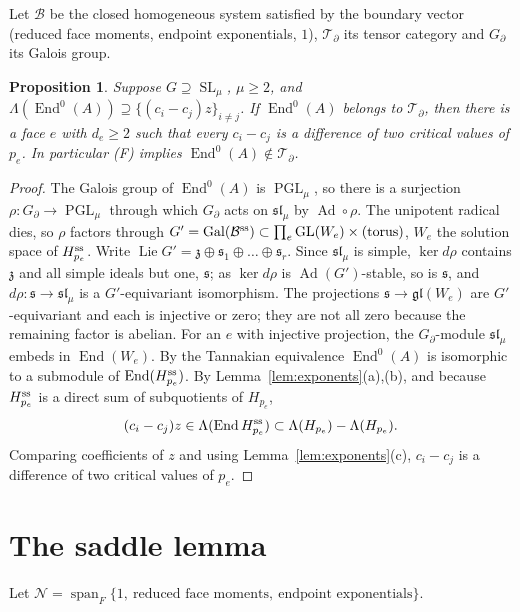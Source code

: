 \documentclass[11pt]{article}
\numberwithin{equation}{section}
\newtheorem{proposition}[theorem]{Proposition}
\theoremstyle{definition}
\theoremstyle{remark}
\newcommand{\SL}{\operatorname{SL}}\newcommand{\GL}{\operatorname{GL}}\newcommand{\PGL}{\operatorname{PGL}}
\newcommand{\End}{\operatorname{End}}\newcommand{\Hom}{\operatorname{Hom}}\newcommand{\Span}{\operatorname{span}}
\newcommand{\Lie}{\operatorname{Lie}}\newcommand{\Gal}{\operatorname{Gal}}\newcommand{\wt}{\operatorname{wt}}
\newcommand{\Ncal}{\mathcal N}\newcommand{\Tcal}{\mathcal T}\newcommand{\Bcal}{\mathcal B}
\begin{document}
Let $\Bcal$ be the closed homogeneous system satisfied by the boundary vector
(reduced face moments, endpoint exponentials, $1$), $\Tcal_\partial$ its tensor
category and $G_\partial$ its Galois group.

\begin{proposition}\label{prop:faces}
Suppose $G\supseteq\SL_\mu$, $\mu\ge2$, and
$\Lambda(\End^0(A))\supseteq\{(c_i-c_j)z\}_{i\ne j}$. If $\End^0(A)$
belongs to $\Tcal_\partial$, then there is a face $e$ with $d_e\ge2$ such that
every $c_i-c_j$ is a difference of two critical values of $p_e$. In particular
\textup{(F)} implies $\End^0(A)\notin\Tcal_\partial$.
\end{proposition}
\begin{proof}
The Galois group of $\End^0(A)$ is $\PGL_\mu$, so there is a surjection
$\rho:G_\partial\to\PGL_\mu$ through which $G_\partial$ acts on
$\mathfrak{sl}_\mu$ by $\operatorname{Ad}\circ\rho$. The unipotent radical dies,
so $\rho$ factors through $G'=\Gal(\Bcal^{\rm ss})\subset\prod_e\GL(W_e)\times(\text{torus})$,
$W_e$ the solution space of $H_{p_e}^{\rm ss}$. Write
$\Lie G'=\mathfrak z\oplus\mathfrak s_1\oplus\dots\oplus\mathfrak s_r$. Since
$\mathfrak{sl}_\mu$ is simple, $\ker d\rho$ contains $\mathfrak z$ and all simple
ideals but one, $\mathfrak s$; as $\ker d\rho$ is $\operatorname{Ad}(G')$-stable,
so is $\mathfrak s$, and $d\rho:\mathfrak s\to\mathfrak{sl}_\mu$ is a
$G'$-equivariant isomorphism. The projections
$\mathfrak s\to\mathfrak{gl}(W_e)$ are $G'$-equivariant and each is injective or
zero; they are not all zero because the remaining factor is abelian. For an
$e$ with injective projection, the $G_\partial$-module $\mathfrak{sl}_\mu$ embeds
in $\End(W_e)$. By the Tannakian equivalence $\End^0(A)$ is isomorphic to a
submodule of $\End(H_{p_e}^{\rm ss})$. By Lemma~\ref{lem:exponents}(a),(b), and
because $H_{p_e}^{\rm ss}$ is a direct sum of subquotients of $H_{p_e}$,
\[
 (c_i-c_j)z\in\Lambda(\End H_{p_e}^{\rm ss})\subset
 \Lambda(H_{p_e})-\Lambda(H_{p_e}).
\]
Comparing coefficients of $z$ and using Lemma~\ref{lem:exponents}(c),
$c_i-c_j$ is a difference of two critical values of $p_e$.
\end{proof}

\section{The saddle lemma}

Let $\Ncal=\Span_F\{1,\ \text{reduced face moments},\ \text{endpoint exponentials}\}$.
\end{document}
